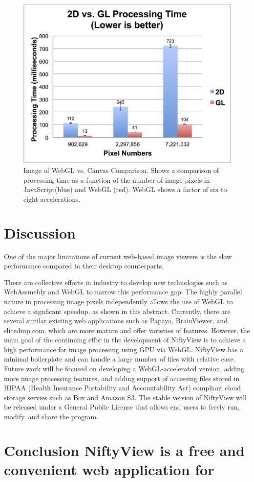 \documentclass[twocolumn]{bmcart}%
\begin{document}
\begin{figure}[h!]
  \includegraphics[width=.47\textwidth]{2d_vs_gl_processing_time.png}
  \caption{\label{centfig}
  Image of WebGL vs. Canvas Comparison. Shows a comparison of processing time as a function of the number of image pixels in JavaScript(blue) and WebGL (red). WebGL shows a factor of six to eight accelerations. }
  \end{figure}

\section{Discussion}\label{discussion}

One of the major limitations of current web-based image viewers is the
slow performance compared to their desktop counterparts.

There are collective efforts in industry to develop new technologies
such as WebAssmebly and WebGL to narrow this performance gap. The highly
parallel nature in processing image pixels independently allows the use
of WebGL to achieve a signficant speedup, as shown in this abstract.
Currently, there are several similar existing web applications such as
Papaya, BrainViewer, and slicedrop.com, which are more mature and offer
varieties of features. However, the main goal of the continuing effor in
the development of NiftyView is to achieve a high performance for image
processing using GPU via WebGL. NiftyView has a minimal boilerplate and
can handle a large number of files with relative ease. Future work will
be focused on developing a WebGL-accelerated version, adding more image
processing features, and adding support of accessing files stored in
HIPAA (Health Insurance Portability and Accountability Act) compliant
cloud storage servies such as Box and Amazon S3. The stable version of
NiftyView will be released under a General Public License that allows
end users to freely run, modify, and share the program.

\section{Conclusion NiftyView is a free and convenient web application
for}\label{conclusion-niftyview-is-a-free-and-convenient-web-application-for}
\end{document}
